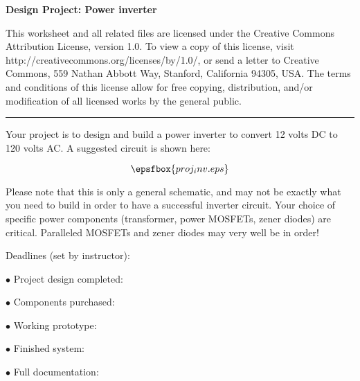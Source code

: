
\centerline{\bf Design Project: Power inverter} \bigskip 
 
This worksheet and all related files are licensed under the Creative Commons Attribution License, version 1.0.  To view a copy of this license, visit http://creativecommons.org/licenses/by/1.0/, or send a letter to Creative Commons, 559 Nathan Abbott Way, Stanford, California 94305, USA.  The terms and conditions of this license allow for free copying, distribution, and/or modification of all licensed works by the general public.

\bigskip 

\hrule

\vskip 10pt

Your project is to design and build a power inverter to convert 12 volts DC to 120 volts AC.  A suggested circuit is shown here:

$$\epsfbox{proj_inv.eps}$$

Please note that this is only a general schematic, and may not be exactly what you need to build in order to have a successful inverter circuit.  Your choice of specific power components (transformer, power MOSFETs, zener diodes) are critical.  Paralleled MOSFETs and zener diodes may very well be in order!

\vskip 10pt

\noindent
Deadlines (set by instructor):

\medskip
\item{$\bullet$} Project design completed: 
\item{$\bullet$} Components purchased:
\item{$\bullet$} Working prototype:
\item{$\bullet$} Finished system:
\item{$\bullet$} Full documentation:
\medskip



